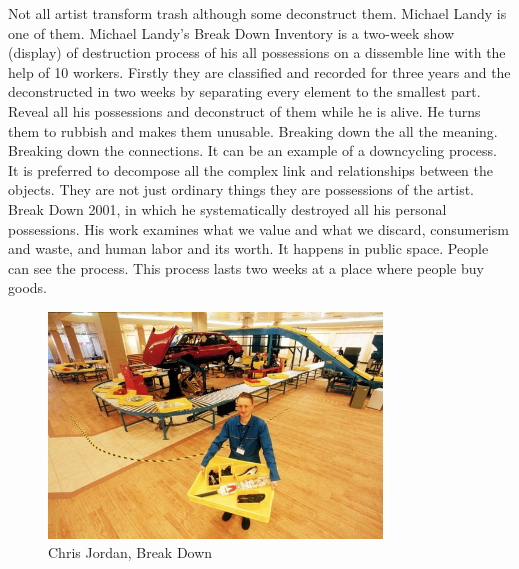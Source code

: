 Not all artist transform trash although some deconstruct them. Michael Landy is one of them. Michael Landy's Break Down Inventory is a two-week show (display) of destruction process of his all possessions on a dissemble line with the help of 10 workers. Firstly they are classified and recorded for three years and the deconstructed in two weeks by separating every element to the smallest part. Reveal all his possessions and deconstruct of them while he is alive. He turns them to rubbish and makes them unusable. Breaking down the all the meaning. Breaking down the connections. It can be an example of a downcycling process. It is preferred to decompose all the complex link and relationships between the objects. They are not just ordinary things they are possessions of the artist. Break Down 2001, in which he systematically destroyed all his personal possessions. His work examines what we value and what we discard, consumerism and waste, and human labor and its worth. It happens in public space. People can see the process. This process lasts two weeks at a place where people buy goods.

\begin{figure}[h!]
  \centering
  \includegraphics[height=6cm]{graphics/ChrisJordan_BreakDown.jpg}
  \caption{Chris Jordan, Break Down}
  \label{fig:ChrisJordan_BreakDown}
\end{figure}


